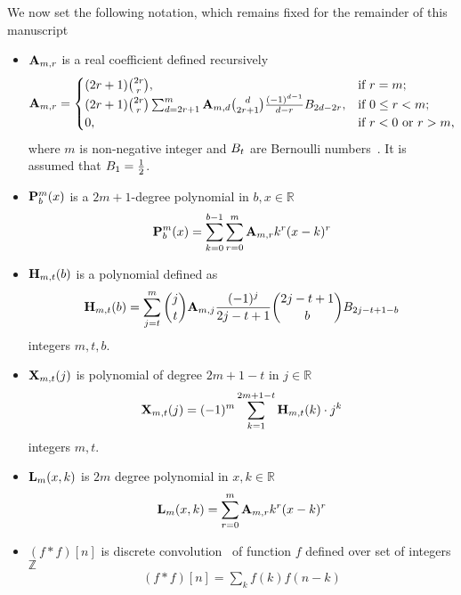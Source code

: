 We now set the following notation, which remains fixed for the remainder of this manuscript
\begin{itemize}
    \setlength\itemsep{1.6em}
    \item ${\mathbf{A}} \sb{m,r}$ is a real coefficient defined recursively
    \begin{equation}
        \label{eq:def_coeff_a}
        {\mathbf{A}} \sb{m,r} =
        \begin{cases}
        (2r+1)
            \binom{2r}{r}, & \text{if } r=m; \\
            (2r+1) \binom{2r}{r} \sum_{d=2r+1}^{m} {\mathbf{A}} \sb{m,d} \binom{d}{2r+1} \frac{(-1)^{d-1}}{d-r}
            {B}\sb{2d-2r}, & \text{if } 0 \leq r<m; \\
            0, & \text{if } r<0 \text{ or } r>m,
        \end{cases}
    \end{equation}
    where $m$ is non-negative integer and ${B}\sb{t}$ are Bernoulli numbers~\cite{WeissteinBernoulli}.
    It is assumed that ${B}\sb{1}=\frac{1}{2}$.

    \item ${\mathbf{P}}\sp{m} \sb{b}(x)$ is a $2m+1$-degree polynomial in $b,x\in\mathbb{R}$
    \begin{equation}
        \label{eq:def_polynomial_p}
        {\mathbf{P}}\sp{m} \sb{b}(x) = \sum_{k=0}^{b-1} \sum_{r=0}^{m} {\mathbf{A}} \sb{m,r} k^r(x-k)^r
    \end{equation}

    \item ${\mathbf{H}} \sb{m,t} (b)$ is a polynomial defined as
    \begin{equation}
        \label{eq:def_coeff_h}
        {\mathbf{H}} \sb{m,t} (b)
        = \sum_{j=t}^{m} \binom{j}{t} {\mathbf{A}} \sb{m,j} \frac{(-1)^j}{2j-t+1} \binom{2j-t+1}{b} {B}\sb{2j-t+1-b}
    \end{equation}
    integers $m,t,b$.

    \item ${\mathbf{X}}\sb{m,t} (j)$ is polynomial of degree $2m+1-t$ in $j\in\mathbb{R}$
    \begin{equation}
        \label{eq:def_coeff_x}
        {\mathbf{X}}\sb{m,t} (j) = (-1)^m \sum_{k=1}^{2m+1-t} {\mathbf{H}} \sb{m,t} (k) \cdot j^k
    \end{equation}
    integers $m,t$.

    \item ${\mathbf{L}}\sb{m}(x,k)$ is $2m$ degree polynomial in $x,k\in\mathbb{R}$
    \begin{equation}
        \label{eq:def_polynomial_l}
        {\mathbf{L}}\sb{m}(x,k) = \sum_{r=0}^{m} {\mathbf{A}} \sb{m,r} k^r(x-k)^r
    \end{equation}

    \item $(f\ast f)[n]$ is discrete convolution~\cite{DiscConv} of function $f$ defined over set of integers $\mathbb{Z}$
    \begin{align*}
    (f\ast f)[n]
        = \sum_{k} f(k) f(n-k)
    \end{align*}
\end{itemize}

